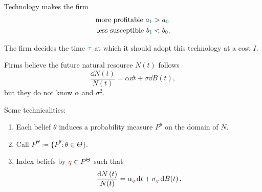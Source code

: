 \documentclass[12pt, aspectratio=169]{beamer}
\newcommand{\con}[1]{{\color{BlueGreen} #1}}
\newcommand{\bel}[1]{{\color{BrickRed} #1}}
\newcommand{\tech}[1]{{\color{PineGreen} #1}}
\begin{document}
\begin{frame}
    Technology makes the firm \begin{align*}
        \text{more profitable } a_{\tech{1}} &> a_{\tech{0}} \\
        \text{less susceptible } b_{\tech{1}} &< b_{\tech{0}}.
    \end{align*}
    
\end{frame}

\begin{frame}
    The firm decides the time $\con{\tau}$ at which it should adopt this technology at a cost $I$.
\end{frame}

\begin{frame}
    Firms believe the future natural resource $N(t)$ follows \begin{equation*}
        \frac{\dd{N}(t)}{N(t)} = \alpha \dd{t} + \sigma \dd{B(t)},
    \end{equation*} but they do not know $\alpha$ and $\sigma^2$. 
    
\end{frame}


\begin{frame}
    Some technicalities: \begin{enumerate}\setlength{\itemsep}{1em}
        \item Each belief $\theta$ induces a probability measure $P^\theta$ on the domain of $N$.
        \pause \item Call $P^{\Theta} \coloneqq \{P^{\theta} : \theta \in \Theta\}$.
        \pause \item Index beliefs by ${\bel{q}} \in P^{\Theta}$ such that \begin{equation*}
            \frac{\dd{N}(t)}{N(t)} = \alpha_{\bel{q}} \dd{t} + \sigma_{\bel{q}} \dd{B(t)},
        \end{equation*}
    \end{enumerate}
\end{frame}
\end{document}
